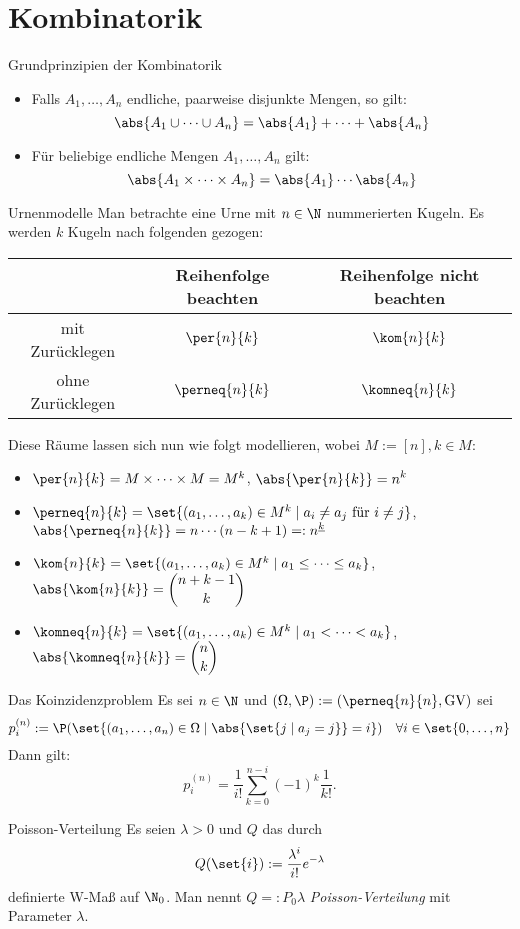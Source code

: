 \section*{Kombinatorik}

\begin{karte}{Grundprinzipien der Kombinatorik}
	\begin{itemize}
		\item Falls $A_1,\dotsc,A_n$ endliche, paarweise disjunkte Mengen, so gilt:
		$$ \abs{A_1 \cup \dots \cup A_n} = \abs{A_1} + \dots + \abs{A_n}$$
		\item Für beliebige endliche Mengen $A_1,\dotsc,A_n$ gilt:
		$$ \abs{A_1 \times \dots \times A_n} = \abs{A_1} \dotsm \abs{A_n}$$
	\end{itemize}
\end{karte}

\begin{karte}{Urnenmodelle}
	Man betrachte eine Urne mit $n \in \N$ nummerierten Kugeln. Es werden $k$ Kugeln nach folgenden  gezogen:
	\begin{center}
		\begin{tabular}{c||c|c}
			& Reihenfolge beachten & Reihenfolge nicht beachten \\
			\hline \hline
			mit Zurücklegen & $\per{n}{k}$ & $\kom{n}{k}$ \\ \hline
			ohne Zurücklegen & $\perneq{n}{k}$ & $\komneq{n}{k}$ \\
		\end{tabular}
	\end{center}
	Diese Räume lassen sich nun wie folgt modellieren, wobei $M:=[n], k \in M$:
	\begin{itemize}
		\item $\per{n}{k}=M\times \dots \times M = M^k$, $ \displaystyle \abs{\per{n}{k}}=n^k$
		\item $\perneq{n}{k}=\set{(a_1,\dotsc,a_k) \in M^k \;|\; a_i \neq a_j \text{ für } i \neq j}$, \\ 
		$\displaystyle \abs{\perneq{n}{k}}=n\dotsm (n-k+1) =: n^{\underline{k}}$
		\item $\kom{n}{k}=\set{(a_1,\dotsc,a_k) \in M^k \;|\; a_1 \leq \dots \leq a_k}$, $\displaystyle \abs{\kom{n}{k}}=\binom{n+k-1}{k}$
		\item $\komneq{n}{k}=\set{(a_1,\dotsc,a_k) \in M^k \;|\; a_1 < \dots < a_k}$, $\displaystyle \abs{\komneq{n}{k}}=\binom{n}{k}$
	\end{itemize}
\end{karte}

\begin{karte}{Das Koinzidenzproblem}
	Es sei $n \in \N$ und $(\Omega,\P):=(\perneq{n}{n},\text{GV})$ sei 
	$$p_i^{(n)}:=\P({\set{(a_1,\dotsc,a_n) \in \Omega \;|\; \abs{\set{j \;|\; a_j = j}} = i}}) \quad \forall i \in \set{0,\dotsc,n}$$
	Dann gilt:
	$$p_i^{(n)}=\frac{1}{i!}\sum_{k=0}^{n-i} (-1)^k \frac{1}{k!}. $$
\end{karte}

\begin{karte}{Poisson-Verteilung}
	Es seien $\lambda > 0$ und $Q$ das durch $$Q(\set{i}):=\frac{\lambda ^{i}}{i!}e^{-\lambda}$$ definierte W-Maß auf $\N_0$. Man nennt $Q=:P_0{\lambda}$ \textit{Poisson-Verteilung} mit Parameter $\lambda$. 
\end{karte}